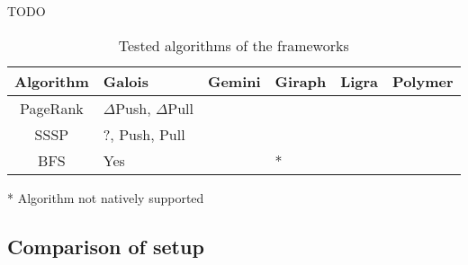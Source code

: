 \newcommand{\txtdag}{\textsuperscript{\textdagger}}
\begin{table}
TODO
	\centering
	\begin{tabularx}{0.9\columnwidth}{cYYYYY}
		\bf{Algorithm}&Galois&Gemini&Giraph&Ligra&Polymer\\\hline
		PageRank&$\Delta$Push, $\Delta$Pull&&&&\\
		SSSP&?, Push, Pull&&&&\\
		BFS&Yes&&*&&\\
		\hline
	\end{tabularx}
	\caption{Tested algorithms of the frameworks}
	\label{tbl:algorithms}

	* Algorithm not natively supported

\end{table}


\subsection{Comparison of setup}

